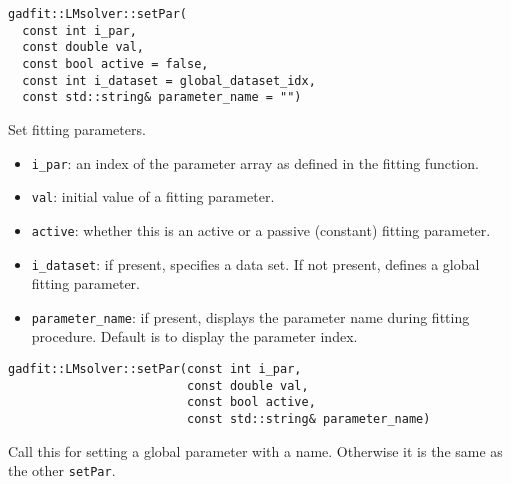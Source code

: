 \documentclass{article}
\begin{document}
\begin{verbatim}
gadfit::LMsolver::setPar(
  const int i_par,
  const double val,
  const bool active = false,
  const int i_dataset = global_dataset_idx,
  const std::string& parameter_name = "")
\end{verbatim}
Set fitting parameters.
\begin{itemize}
\item \verb+i_par+: an index of the parameter array as defined in the fitting function.
\item \verb+val+: initial value of a fitting parameter.
\item \verb+active+: whether this is an active or a passive (constant) fitting parameter.
\item \verb+i_dataset+: if present, specifies a data set. If not present, defines a global fitting parameter.
\item \verb+parameter_name+: if present, displays the parameter name during fitting procedure. Default is to display the parameter index.
\end{itemize}

\begin{verbatim}
gadfit::LMsolver::setPar(const int i_par,
                         const double val,
                         const bool active,
                         const std::string& parameter_name)
\end{verbatim}
Call this for setting a global parameter with a name. Otherwise it is the same as the other \texttt{setPar}.
\end{document}
